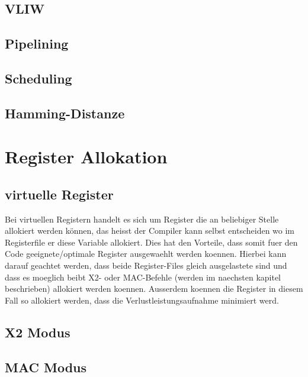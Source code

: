 \subsection{VLIW}
\subsection{Pipelining}
\subsection{Scheduling}
\subsection{Hamming-Distanze}


\section{Register Allokation}
\label{sec:register allok}
\subsection{virtuelle Register}
Bei virtuellen Registern handelt es sich um Register die an beliebiger Stelle allokiert werden können, das heisst der Compiler kann selbst entscheiden wo im Registerfile er diese Variable allokiert. Dies hat den Vorteile, dass somit fuer den Code geeignete/optimale Register ausgewaehlt werden koennen. Hierbei kann darauf geachtet werden, dass beide Register-Files gleich ausgelastete sind und dass es moeglich beibt X2- oder MAC-Befehle (werden im naechsten kapitel beschrieben) allokiert werden koennen. Ausserdem koennen die Register in diesem Fall so allokiert werden, dass die Verlustleistungsaufnahme minimiert werd.
\subsection{X2 Modus}
\subsection{MAC Modus}